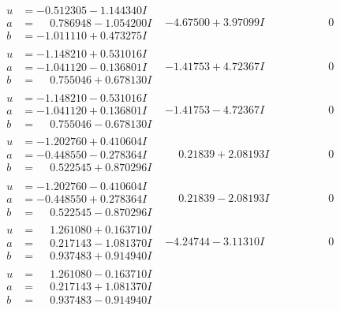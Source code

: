 \documentclass[1p]{elsarticle_modified}
\theoremstyle{definition}
\begin{document}
$$\begin{array}{c|c|c}
\begin{aligned}
u &= -0.512305 - 1.144340 I \\
a &= \phantom{-}0.786948 - 1.054200 I \\
b &= -1.011110 + 0.473275 I\end{aligned}
 & -4.67500 + 3.97099 I & \phantom{-0.000000 } 0 \\ \hline\begin{aligned}
u &= -1.148210 + 0.531016 I \\
a &= -1.041120 - 0.136801 I \\
b &= \phantom{-}0.755046 + 0.678130 I\end{aligned}
 & -1.41753 + 4.72367 I & \phantom{-0.000000 } 0 \\ \hline\begin{aligned}
u &= -1.148210 - 0.531016 I \\
a &= -1.041120 + 0.136801 I \\
b &= \phantom{-}0.755046 - 0.678130 I\end{aligned}
 & -1.41753 - 4.72367 I & \phantom{-0.000000 } 0 \\ \hline\begin{aligned}
u &= -1.202760 + 0.410604 I \\
a &= -0.448550 - 0.278364 I \\
b &= \phantom{-}0.522545 + 0.870296 I\end{aligned}
 & \phantom{-}0.21839 + 2.08193 I & \phantom{-0.000000 } 0 \\ \hline\begin{aligned}
u &= -1.202760 - 0.410604 I \\
a &= -0.448550 + 0.278364 I \\
b &= \phantom{-}0.522545 - 0.870296 I\end{aligned}
 & \phantom{-}0.21839 - 2.08193 I & \phantom{-0.000000 } 0 \\ \hline\begin{aligned}
u &= \phantom{-}1.261080 + 0.163710 I \\
a &= \phantom{-}0.217143 - 1.081370 I \\
b &= \phantom{-}0.937483 + 0.914940 I\end{aligned}
 & -4.24744 - 3.11310 I & \phantom{-0.000000 } 0 \\ \hline\begin{aligned}
u &= \phantom{-}1.261080 - 0.163710 I \\
a &= \phantom{-}0.217143 + 1.081370 I \\
b &= \phantom{-}0.937483 - 0.914940 I\end{aligned}

\end{array}$$
\end{document}
